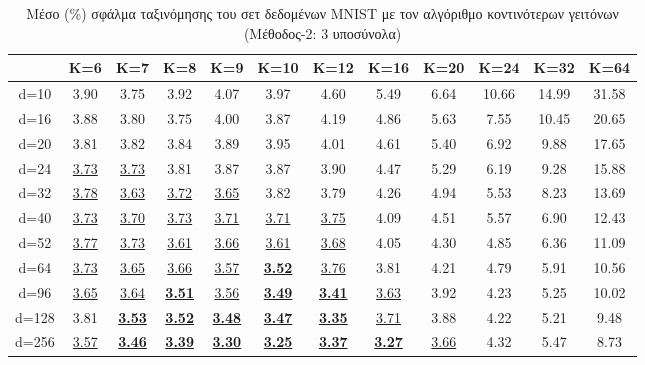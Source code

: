 \begin{table}[H]
\singlespacing
\centering
\label{tab:table2}
\caption{Μέσο (\%) σφάλμα ταξινόμησης του σετ δεδομένων \textlatin{MNIST} με τον αλγόριθμο κοντινότερων γειτόνων (Μέθοδος-2: 3 υποσύνολα)}
\vspace*{5mm}
\begin{tabular}{|c|c|c|c|c|c|c|c|c|c|c|c|}
\hline
& K=6 & K=7 & K=8 & K=9 & K=10 & K=12 & K=16 & K=20 & K=24 & K=32 & K=64 \\
\hline
d=10 & 3.90 & 3.75 & 3.92 & 4.07 & 3.97 & 4.60 & 5.49 & 6.64 & 10.66 & 14.99 & 31.58 \\
d=16 & 3.88 & 3.80 & 3.75 & 4.00 & 3.87 & 4.19 & 4.86 & 5.63 & 7.55 & 10.45 & 20.65 \\
d=20 & 3.81 & 3.82 & 3.84 & 3.89 & 3.95 & 4.01 & 4.61 & 5.40 & 6.92 & 9.88 & 17.65 \\
d=24 & \underline{3.73} & \underline{3.73} & 3.81 & 3.87 & 3.87 & 3.90 & 4.47 & 5.29 & 6.19 & 9.28 & 15.88 \\
d=32 & \underline{3.78} & \underline{3.63} & \underline{3.72} & \underline{3.65} & 3.82 & 3.79 & 4.26 & 4.94 & 5.53 & 8.23 & 13.69 \\
d=40 & \underline{3.73} & \underline{3.70} & \underline{3.73} & \underline{3.71} & \underline{3.71} & \underline{3.75} & 4.09 & 4.51 & 5.57 & 6.90 & 12.43 \\
d=52 & \underline{3.77} & \underline{3.73} & \underline{3.61} & \underline{3.66} & \underline{3.61} & \underline{3.68} & 4.05 & 4.30 & 4.85 & 6.36 & 11.09 \\
d=64 & \underline{3.73} & \underline{3.65} & \underline{3.66} & \underline{3.57} & \underline{\textbf{3.52}} & \underline{3.76} & 3.81 & 4.21 & 4.79 & 5.91 & 10.56 \\
d=96 & \underline{3.65} & \underline{3.64} & \underline{\textbf{3.51}} & \underline{3.56} & \underline{\textbf{3.49}} & \underline{\textbf{3.41}} & \underline{3.63} & 3.92 & 4.23 & 5.25 & 10.02 \\
d=128 & 3.81 & \underline{\textbf{3.53}} & \underline{\textbf{3.52}} & \underline{\textbf{3.48}} & \underline{\textbf{3.47}} & \underline{\textbf{3.35}} & \underline{3.71} & 3.88 & 4.22 & 5.21 & 9.48 \\
d=256 & \underline{3.57} & \underline{\textbf{3.46}} & \underline{\textbf{3.39}} & \underline{\textbf{3.30}} & \underline{\textbf{3.25}} & \underline{\textbf{3.37}} & \underline{\textbf{3.27}} & \underline{3.66} & 4.32 & 5.47 & 8.73 \\
\hline
\end{tabular}
\end{table}

